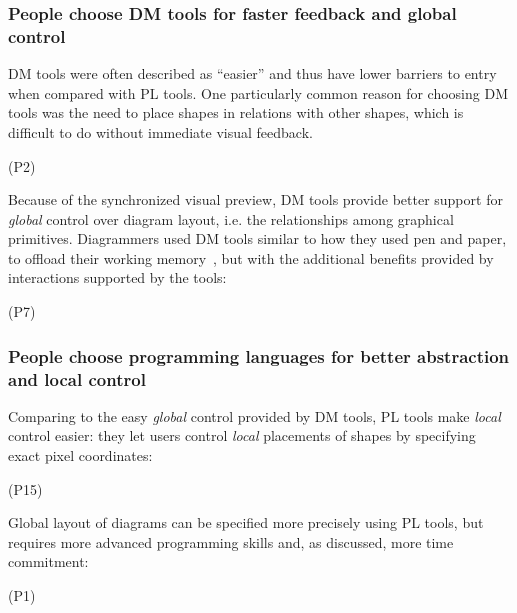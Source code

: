 \subsubsection{People choose DM tools for faster feedback and global control}
DM tools were often described as ``easier'' and thus have lower barriers to entry when compared with PL tools.  One particularly common reason for choosing DM tools was the need to place shapes in relations with other shapes, which is difficult to do without immediate visual feedback.

     (P2)
    
Because of the synchronized visual preview, DM tools provide better support for \emph{global} control over diagram layout, i.e. the relationships among graphical primitives. Diagrammers used DM tools similar to how they used pen and paper, to offload their working memory~\cite{whyDiagramWorth}, but with the additional benefits provided by interactions supported by the tools:

  (P7)

\subsubsection{People choose programming languages for better abstraction and local control}

Comparing to the easy \emph{global} control provided by DM tools, PL tools make \textit{local} control easier: they let users control \emph{local} placements of shapes by specifying exact pixel coordinates:

     (P15)

Global layout of diagrams can be specified more precisely using PL tools, but requires more advanced programming skills and, as discussed, more time commitment:

     (P1)

